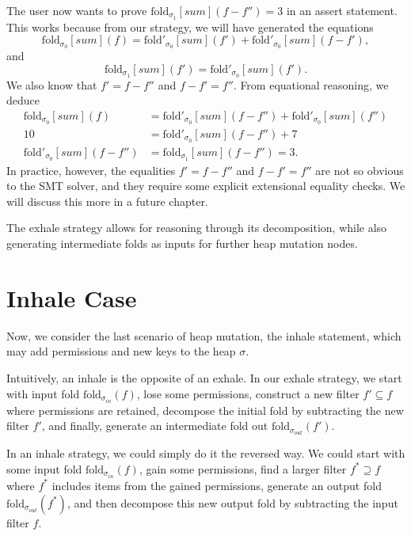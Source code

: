 \documentclass[msc,oneside]{ubcthesis}
\theoremstyle{definition}
\begin{document}
The user now wants to prove $\textrm{fold}_{\sigma_1}[\textit{sum}](f - f'') = 3$ in an assert statement. This works because from our strategy, we will have generated the equations
$$\textrm{fold}_{\sigma_0}[\textit{sum}](f) = \textrm{fold}'_{\sigma_0}[\textit{sum}](f') + \textrm{fold}'_{\sigma_0}[\textit{sum}](f - f'), $$ and
$$\textrm{fold}_{\sigma_1}[\textit{sum}](f') = \textrm{fold}'_{\sigma_0}[\textit{sum}](f'). $$
We also know that $f' = f - f''$ and $f - f' = f''$. From equational reasoning, we deduce
\begin{align*} 
\textrm{fold}_{\sigma_0}[\textit{sum}](f) &= \textrm{fold}'_{\sigma_0}[\textit{sum}](f - f'') + \textrm{fold}'_{\sigma_0}[\textit{sum}](f'') \\
10 &= \textrm{fold}'_{\sigma_0}[\textit{sum}](f - f'') + 7 \\
\textrm{fold}'_{\sigma_0}[\textit{sum}](f - f'') &= \textrm{fold}_{\sigma_1}[\textit{sum}](f - f'') = 3. 
\end{align*}
In practice, however, the equalities $f' = f - f''$ and $f - f' = f''$ are not so obvious to the SMT solver, and they require some explicit extensional equality checks. We will discuss this more in a future chapter.

The exhale strategy allows for reasoning through its decomposition, while also generating intermediate folds as inputs for further heap mutation nodes.

\section{Inhale Case}
Now, we consider the last scenario of heap mutation, the inhale statement, which may add permissions and new keys to the heap $\sigma$. 

Intuitively, an inhale is the opposite of an exhale. In our exhale strategy, we start with input fold $\textrm{fold}_{\sigma_{in}}(f)$, lose some permissions, construct a new filter $f' \subseteq f$ where permissions are retained, decompose the initial fold by subtracting the new filter $f'$, and finally, generate an intermediate fold out $\textrm{fold}_{\sigma_{out}}(f')$. 

In an inhale strategy, we could simply do it the reversed way. We could start with some input fold $\textrm{fold}_{\sigma_{in}}(f)$, gain some permissions, find a larger filter $f^* \supseteq f$ where $f^*$ includes items from the gained permissions, generate an output fold $\textrm{fold}_{\sigma_{out}}(f^*)$, and then decompose this new output fold by subtracting the input filter $f$.
\end{document}
